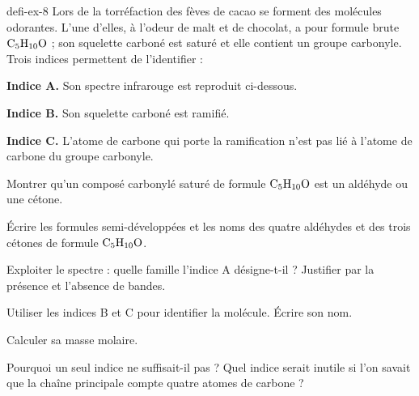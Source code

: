 \begin{blocEdition}{defi-ex-8}
Lors de la torréfaction des fèves de cacao se forment des molécules odorantes. L'une d'elles, à l'odeur de malt et de
chocolat, a pour formule brute $\ce{C5H10O}$ ; son squelette carboné est saturé et elle contient un groupe carbonyle. Trois
indices permettent de l'identifier :
\begin{questions}
\item[] \textbf{Indice A.} Son spectre infrarouge est reproduit ci-dessous.
\item[] \textbf{Indice B.} Son squelette carboné est ramifié.
\item[] \textbf{Indice C.} L'atome de carbone qui porte la ramification n'est pas lié à l'atome de carbone du groupe carbonyle.
\end{questions}
\label{figedition-defi-ex-8-1}
\begin{questions}
\item Montrer qu'un composé carbonylé saturé de formule $\ce{C5H10O}$ est un aldéhyde ou une cétone.
\item Écrire les formules semi-développées et les noms des quatre aldéhydes et des trois cétones de formule $\ce{C5H10O}$.
\item Exploiter le spectre : quelle famille l'indice A désigne-t-il ? Justifier par la présence et l'absence de bandes.
\item Utiliser les indices B et C pour identifier la molécule. Écrire son nom.
\item Calculer sa masse molaire.
\item Pourquoi un seul indice ne suffisait-il pas ? Quel indice serait inutile si l'on savait que la chaîne principale compte
quatre atomes de carbone ?
\end{questions}
\end{blocEdition}

